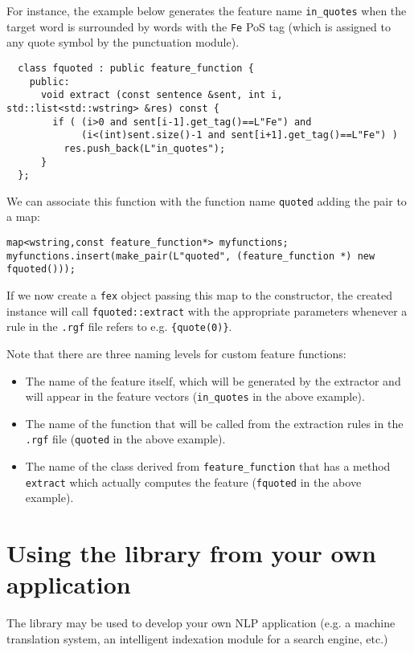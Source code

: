 \documentclass[a4paper]{book}
\begin{document}
  For instance, the example below generates the feature name \texttt{in\_quotes} when
  the target word is surrounded by words with the \texttt{Fe} PoS tag (which is 
  assigned to any quote symbol by the punctuation module).
\begin{verbatim}
  class fquoted : public feature_function {
    public:
      void extract (const sentence &sent, int i, std::list<std::wstring> &res) const {
        if ( (i>0 and sent[i-1].get_tag()==L"Fe") and
             (i<(int)sent.size()-1 and sent[i+1].get_tag()==L"Fe") )
          res.push_back(L"in_quotes");
      }
  };
\end{verbatim}

We can associate this function with the function name {\tt quoted} adding the pair to a map:
\begin{verbatim}
map<wstring,const feature_function*> myfunctions;
myfunctions.insert(make_pair(L"quoted", (feature_function *) new fquoted()));
\end{verbatim}

If we now create a \texttt{fex} object passing this map to the constructor, 
the created instance will call {\tt fquoted::extract} with the appropriate parameters
whenever a rule in the {\tt .rgf} file refers to e.g. \verb#{quote(0)}#.

 Note that there are three naming levels for custom feature functions:
  \begin{itemize}
  \item The name of the feature itself, which will be generated by the
    extractor and will appear in the feature vectors (\verb#in_quotes# in the
    above example).
  \item The name of the function that will be called from the
    extraction rules in the {\tt .rgf} file (\verb#quoted# in the
    above example).
  \item The name of the class derived from \verb#feature_function#
    that has a method \verb#extract# which actually computes the
    feature (\verb#fquoted# in the above example).
 \end{itemize}


\chapter{Using the library from your own application}

 The library may be used to develop your own NLP application (e.g. a
 machine translation system, an intelligent indexation module for a
 search engine, etc.)
\end{document}
